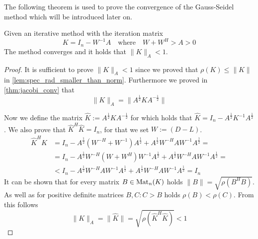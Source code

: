 The following theorem is used to prove the convergence of the Gauss-Seidel method which will be introduced later on.
\begin{theorem}\label{thm:abstr_gauss_seidel_conv}
   Given an iterative method with the iteration matrix
   \[K = I_n - W^{-1}A \quad\text{where}\quad W + W^H > A > 0\]
   The method converges and it holds that \(\|K\|_A < 1\).
\end{theorem}
\begin{proof}
   It is sufficient to prove \(\|K\|_A < 1\) since we proved that \(\rho(K) \leq \|K\|\) in \cref{lem:spec_rad_smaller_than_norm}.
   Furthermore we proved in \cref{thm:jacobi_conv} that
   \[\|K\|_A = \|A^\frac{1}{2}KA^{-\frac{1}{2}}\|\]

   Now we define the matrix \(\hat{K} := A^\frac{1}{2}KA^{-\frac{1}{2}}\) for which holds that \(\hat{K} = I_n - A^\frac{1}{2}K^{-1}A^\frac{1}{2}\).
   We also prove that \(\hat{K}^H \hat{K} = I_n\), for that we set \(W := (D-L)\).
   \begin{equation*}
      \begin{split}
         \hat{K}^H \hat{K} & = I_n - A^\frac{1}{2}(W^{-H} + W^{-1})A^\frac{1}{2} + A^\frac{1}{2}W^{-H}AW^{-1}A^\frac{1}{2} = \\
                           & = I_n - A^\frac{1}{2}W^{-H}(W + W^H)W^{-1}A^\frac{1}{2} + A^\frac{1}{2}W^{-H}AW^{-1}A^\frac{1}{2} = \\
                           & < I_n - A^\frac{1}{2}W^{-H}AW^{-1}A^\frac{1}{2} + A^\frac{1}{2}W^{-H}AW^{-1}A^\frac{1}{2} = I_n
      \end{split}
   \end{equation*}
   It can be shown that for every matrix \(B \in \operatorname{Mat}_n(K)\) holds \(\|B\| = \sqrt{\rho(B^HB)}\).
   As well as for positive definite matrices \(B, C: C > B\) holds \(\rho(B) < \rho(C)\).
   From this follows
   \[\|K\|_A = \|\hat{K}\| = \sqrt{\rho(\hat{K}^H\hat{K})} < 1\]
\end{proof}


